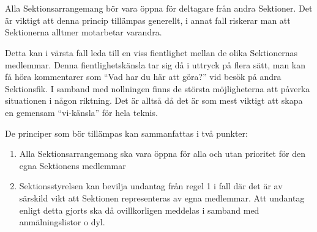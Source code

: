 \documentclass[10pt]{article}
\begin{document}
\section*{\doctitle}

Alla Sektionsarrangemang bör vara öppna för deltagare från andra Sektioner.
Det är viktigt att denna princip tillämpas generellt, i annat fall riskerar man att Sektionerna alltmer motarbetar varandra.

Detta kan i värsta fall leda till en viss fientlighet mellan de olika Sektionernas medlemmar. Denna fientlighetskänsla tar sig då i uttryck på flera sätt, man kan få höra kommentarer som ``Vad har du här att göra?'' vid besök på andra Sektionsfik. I samband med nollningen finns de största möjligheterna att påverka situationen i någon riktning. Det är alltså då det är som mest viktigt att skapa en gemensam ``vi-känsla'' för hela teknis.

De principer som bör tillämpas kan sammanfattas i två punkter:

\begin{enumerate}
\item Alla Sektionsarrangemang ska vara öppna för alla och utan prioritet för den egna Sektionens medlemmar
\item Sektionsstyrelsen kan bevilja undantag från regel 1 i fall där det är av särskild vikt att Sektionen representeras av egna medlemmar. Att undantag enligt detta gjorts ska då ovillkorligen meddelas i samband med anmälningslistor o dyl.
\end{enumerate}
\end{document}
